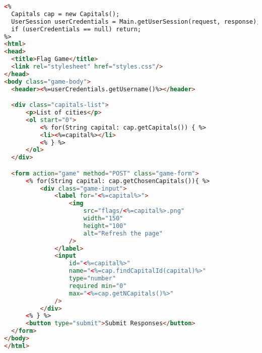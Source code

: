 \begin{lstlisting}[language=html, caption={game.jsp code}]
<%
  Capitals cap = new Capitals();
  UserSession userCredentials = Main.getUserSession(request, response);
  if (userCredentials == null) return;
%>
<html>
<head>
  <title>Flag Game</title>
  <link rel="stylesheet" href="styles.css"/>
</head>
<body class="game-body">
  <header><%=userCredentials.getUsername()%></header>

  <div class="capitals-list">
      <p>List of cities</p>
      <ol start="0">
          <% for(String capital: cap.getCapitals()) { %>
          <li><%=capital%></li>
          <% } %>
      </ol>
  </div>

  <form action="game" method="POST" class="game-form">
      <% for(String capital: cap.getChosenCapitals()){ %>
          <div class="game-input">
              <label for="<%=capital%>">
                  <img 
                      src="flags/<%=capital%>.png" 
                      width="150" 
                      height="100" 
                      alt="Refresh the page"
                  />
              </label>
              <input 
                  id="<%=capital%>"
                  name="<%=cap.findCapitalId(capital)%>"
                  type="number" 
                  required min="0" 
                  max="<%=cap.getNCapitals()%>"
              />
          </div>
      <% } %>
      <button type="submit">Submit Responses</button>
  </form>
</body>
</html>
\end{lstlisting}